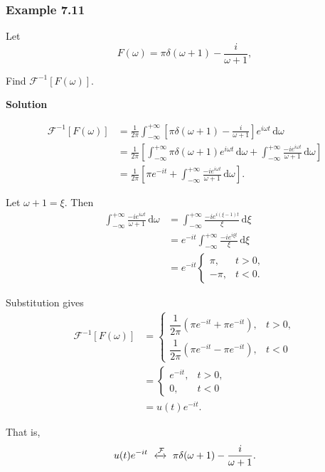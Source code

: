 \documentclass[11pt,a4paper]{article}
\theoremstyle{definition}
\theoremstyle{plain}
\begin{document}
\subsubsection*{Example 7.11}

Let
\[
F(\omega)=\pi\delta(\omega+1)-\frac{i}{\omega+1},
\]

Find \(\mathcal F^{-1}[F(\omega)]\).

\textbf{Solution}\par\nopagebreak[4]
\[
\begin{aligned}
\mathcal F^{-1}[F(\omega)]
&=\frac1{2\pi}\int_{-\infty}^{+\infty}
\left[\pi\delta(\omega+1)-\frac{i}{\omega+1}\right]
e^{i\omega t}\,\mathrm d\omega\\
&=\frac1{2\pi}\left[
\int_{-\infty}^{+\infty}
\pi\delta(\omega+1)e^{i\omega t}\,\mathrm d\omega
+\int_{-\infty}^{+\infty}
\frac{-ie^{i\omega t}}{\omega+1}\,\mathrm d\omega
\right]\\
&=\frac1{2\pi}\left[
\pi e^{-it}
+\int_{-\infty}^{+\infty}
\frac{-ie^{i\omega t}}{\omega+1}\,\mathrm d\omega
\right].
\end{aligned}
\]

Let \(\omega+1=\xi\). Then
\[
\begin{aligned}
\int_{-\infty}^{+\infty}
\frac{-ie^{i\omega t}}{\omega+1}\,\mathrm d\omega
&=\int_{-\infty}^{+\infty}
\frac{-ie^{i(\xi-1)t}}{\xi}\,\mathrm d\xi\\
&=e^{-it}\int_{-\infty}^{+\infty}
\frac{-ie^{i\xi t}}{\xi}\,\mathrm d\xi\\
&=e^{-it}
\begin{cases}
\pi,&t>0,\\
-\pi,&t<0.
\end{cases}
\end{aligned}
\]

Substitution gives
\[
\begin{aligned}
\mathcal F^{-1}[F(\omega)]
&=
\begin{cases}
\dfrac1{2\pi}(\pi e^{-it}+\pi e^{-it}),&t>0,\\[4pt]
\dfrac1{2\pi}(\pi e^{-it}-\pi e^{-it}),&t<0
\end{cases}\\
&=
\begin{cases}
e^{-it},&t>0,\\
0,&t<0
\end{cases}\\
&=u(t)e^{-it}.
\end{aligned}
\]

That is,
\[
u(t)e^{-it}
\ \xleftrightarrow{\mathcal F}\
\pi\delta(\omega+1)-\frac{i}{\omega+1}.
\]
\end{document}
